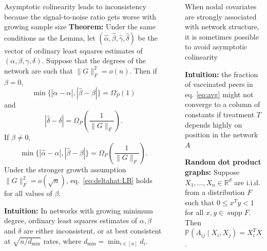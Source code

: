 \documentclass[final]{beamer}
\newcommand{\R}{\mathbb{R}}
\newcommand{\alphahat}{\hat{\alpha}}
\newcommand{\gammahat}{\hat{\gamma}}
\newcommand{\deltahat}{\hat{\delta}}
\newcommand{\betahat}{\hat{\beta}}
\newcommand \Omegap [1] {\Omega_P \left(#1\right)}
\DeclareMathOperator*{\supp}{supp}
\newlength{\sepwidth}
\newlength{\colwidth}
\newcommand{\separatorcolumn}{\begin{column}{\sepwidth}\end{column}}
\begin{document}
\begin{frame}[t]
\begin{columns}[t]
\begin{column}{\colwidth}
\begin{block}{Asymptotic colinearity leads to inconsistency because the signal-to-noise ratio gets worse with growing sample size}
                \textbf{Theorem:} Under the same conditions as the Lemma, let $(\alphahat, \betahat, \gammahat, \deltahat)$ be the vector of ordinary least squares estimates of $(\alpha, \beta, \gamma, \delta)$. Suppose that the degrees of the network are such that $\| G \|_F^2 = o(n)$.
                Then if $\beta = 0$,
                \begin{equation*}
                    \min\{ |\alphahat-\alpha|, |\betahat-\beta| \}
                    = \Omegap{ 1 }
                \end{equation*}
                and
                \begin{equation} \label{eq:deltahat:LB}
                    | \deltahat - \delta | = \Omegap{ \frac{1}{\|G\|_F} }.
                \end{equation}
                If $\beta \neq 0$,
                \begin{equation*}
                    \min\{ |\alphahat-\alpha|, |\betahat-\beta| \}
                    = \Omegap{ \frac{1}{\|G\|_F} }.
                \end{equation*}
                Under the stronger growth assumption $\|G\|_F^2 = o( \sqrt{n} )$, eq.~\eqref{eq:deltahat:LB} holds for all values of $\beta$.
                \vspace{3mm}

                \textbf{Intuition:} In networks with growing minimum degree, ordinary least squares estimates of $\alpha, \beta$ and $\delta$ are either inconsistent, or at best consistent at $\sqrt{n / d_\mathrm{min}}$ rates, where $d_\mathrm{min} = \min_{i \in [n]} d_i$.
            \end{block}
        \end{column}

        \separatorcolumn

        \begin{column}{\colwidth}
            \begin{block}{When nodal covariates are strongly associated with network structure, it is sometimes possible to avoid asymptotic colinearity}

                \textbf{Intuition:} the fraction of vaccinated peers in eq. \eqref{eq:avg} might not converge to a column of constants if treatment $T$ depends highly on position in the network $A$

                \textbf{Random dot product graphs:} Suppose $X_1, ..., X_n \in \R^d$ are i.i.d. from a distribution $F$ such that $0 \le x^T y < 1$ for all $x,y \in \supp F$. Then $\mathbb{P}(A_{ij} \mid X_i, X_j) = X_i^T X_j$.


\end{block}
\end{column}
\end{columns}
\end{frame}
\end{document}
